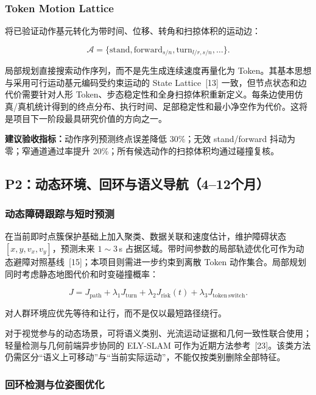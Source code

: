 \documentclass[11pt,a4paper,fontset=none]{ctexart}
\begin{document}
\subsubsection{Token Motion Lattice}

将已验证动作基元转化为带时间、位移、转角和扫掠体积的运动边：

\begin{equation}
\mathcal A=\{\text{stand},\text{forward}_{s/n},\text{turn}_{l/r,s/n},\ldots\}.
\end{equation}

局部规划直接搜索动作序列，而不是先生成连续速度再量化为 Token。其基本思想与采用可行运动基元编码受约束运动的 State Lattice~[13] 一致，但节点状态和边代价需要针对人形 Token、步态稳定性和全身扫掠体积重新定义。每条边使用仿真/真机统计得到的终点分布、执行时间、足部稳定性和最小净空作为代价。这将是项目下一阶段最具研究价值的方向之一。

\textbf{建议验收指标：}动作序列预测终点误差降低 30\%；无效 stand/forward 抖动为零；窄通道通过率提升 20\%；所有候选动作的扫掠体积均通过碰撞复核。

\subsection{P2：动态环境、回环与语义导航（4--12个月）}

\subsubsection{动态障碍跟踪与短时预测}

在当前即时点簇保护基础上加入聚类、数据关联和速度估计，维护障碍状态 $[x,y,v_x,v_y]$，预测未来 $1\sim3\,$s 占据区域。带时间参数的局部轨迹优化可作为动态避障对照基线~[15]；本项目则需进一步约束到离散 Token 动作集合。局部规划同时考虑静态地图代价和时变碰撞概率：

\begin{equation}
J=J_{\mathrm{path}}+\lambda_1J_{\mathrm{turn}}+\lambda_2J_{\mathrm{risk}}(t)
+\lambda_3J_{\mathrm{token\ switch}}.
\end{equation}

对人群环境应优先等待和让行，而不是仅以最短路径绕行。

对于视觉参与的动态场景，可将语义类别、光流运动证据和几何一致性联合使用；轻量检测与几何前端异步协同的 ELY-SLAM 可作为近期方法参考~[23]。该类方法仍需区分“语义上可移动”与“当前实际运动”，不能仅按类别删除全部特征。

\subsubsection{回环检测与位姿图优化}
\end{document}
